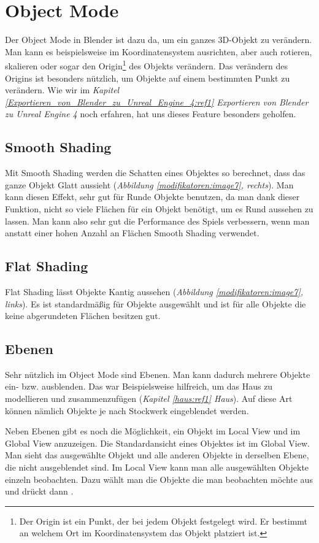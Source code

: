 \section{Object Mode}
Der Object Mode in Blender ist dazu da, um ein ganzes 3D-Objekt zu verändern. Man kann es beispielsweise im Koordinatensystem ausrichten, aber
auch rotieren, skalieren oder sogar den Origin\footnote{Der Origin ist ein Punkt, der bei jedem Objekt festgelegt wird. Er bestimmt an welchem Ort im Koordinatensystem das Objekt platziert ist.}
des Objekts verändern. Das verändern des Origins ist besonders nützlich, um Objekte auf einem bestimmten Punkt zu verändern.
Wie wir im \textit{Kapitel \ref{Exportieren_von_Blender_zu_Unreal_Engine_4:ref1} \dq{} Exportieren von Blender zu Unreal Engine 4\dq} noch erfahren, hat uns dieses Feature besonders geholfen.

\subsection{Smooth Shading}
\label{objectMode:smoothshading}
Mit Smooth Shading werden die Schatten eines Objektes so berechnet, dass das ganze Objekt Glatt aussieht (\textit{Abbildung \ref{modifikatoren:image7}, rechts}).
Man kann diesen Effekt, sehr gut für Runde Objekte benutzen, da man dank dieser Funktion, nicht so viele Flächen für ein Objekt benötigt, um
es Rund aussehen zu lassen. Man kann also sehr gut die Performance des Spiels verbessern, wenn man anstatt einer hohen Anzahl an Flächen Smooth Shading verwendet.

\subsection{Flat Shading}
Flat Shading lässt Objekte Kantig aussehen (\textit{Abbildung \ref{modifikatoren:image7}, links}).
Es ist standardmäßig für Objekte ausgewählt und ist für alle Objekte die keine abgerundeten Flächen besitzen gut.

\subsection{Ebenen}
Sehr nützlich im Object Mode sind Ebenen. Man kann dadurch mehrere Objekte ein- bzw. ausblenden.
Das war Beispielsweise hilfreich, um das Haus zu modellieren und zusammenzufügen (\textit{Kapitel \ref{haus:ref1} \dq Haus\dq}).
Auf diese Art können nämlich Objekte je nach Stockwerk eingeblendet werden.

Neben Ebenen gibt es noch die Möglichkeit, ein Objekt im Local View und im Global View anzuzeigen.
Die Standardansicht eines Objektes ist im Global View. Man sieht das ausgewählte Objekt und alle anderen Objekte in derselben Ebene, die nicht ausgeblendet sind.
Im Local View kann man alle ausgewählten Objekte einzeln beobachten. Dazu wählt man die Objekte die man beobachten möchte aus und drückt dann .
